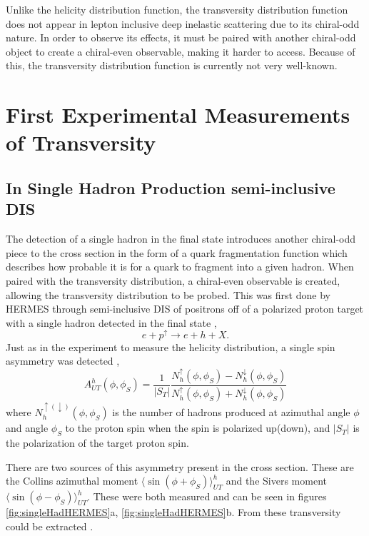 \documentclass[letterpaper, abstract = on,listof=totoc, bibliography=totoc]{scrreprt}
\begin{document}
Unlike the helicity distribution function, the transversity distribution function does not appear in lepton inclusive deep inelastic scattering due to its chiral-odd nature. In order to observe its effects, it must be paired with another chiral-odd object to create a chiral-even observable, making it harder to access. Because of this, the transversity distribution function is currently not very well-known.
\section{First Experimental Measurements of Transversity}
\subsection{In Single Hadron Production semi-inclusive DIS}
The detection of a single hadron in the final state introduces another chiral-odd piece to the cross section in the form of a quark fragmentation function which describes how probable it is for a quark to fragment into a given hadron. When paired with the transversity distribution, a chiral-even observable is created, allowing the transversity distribution to be probed. This was first done by HERMES through semi-inclusive DIS of positrons off of a polarized proton target with a single hadron detected in the final state \cite{Airapetian:2004tw, Anselmino:2007fs}, 
\begin{equation}
e+p^\uparrow \rightarrow e + h + X.
\end{equation}
Just as in the experiment to measure the helicity distribution, a single spin asymmetry was detected \cite{Airapetian:2004tw},
\begin{equation}
A^h_{UT}(\phi,\phi_S) = \frac{1}{|S_T|}\frac{N^\uparrow_h(\phi,\phi_S) - N^\downarrow_h(\phi,\phi_S)}{N^\uparrow_h(\phi,\phi_S) + N^\downarrow_h(\phi,\phi_S)}
\end{equation} 
where $N^{\uparrow(\downarrow)}_h(\phi,\phi_S)$ is the number of hadrons produced at azimuthal angle $\phi$ and angle $\phi_S$ to the proton spin when the spin is polarized up(down), and $|S_T|$ is the polarization of the target proton spin. 

There are two sources of this asymmetry present in the cross section. These are the Collins azimuthal moment $\langle\sin(\phi+\phi_S)\rangle_{UT}^h$ and the Sivers moment $\langle\sin(\phi-\phi_S)\rangle_{UT}^h$. These were both measured and can be seen in figures \ref{fig:singleHadHERMES}a, \ref{fig:singleHadHERMES}b. From these transversity could be extracted \cite{Anselmino:2007fs}.
\end{document}
